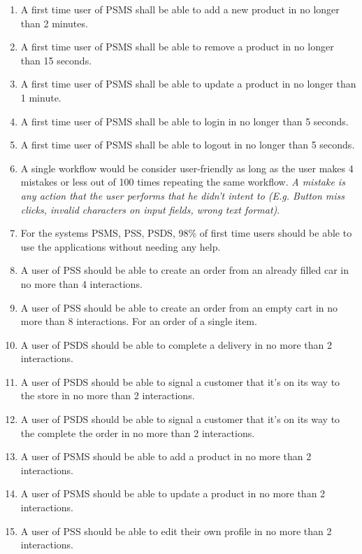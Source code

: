 \begin{enumerate}[label=USE-\arabic*]
    \item A first time user of PSMS shall be able to add a new product in 
    no longer than 2 minutes.
    \item A first time user of PSMS shall be able to remove a product in 
    no longer than 15 seconds.
    \item A first time user of PSMS shall be able to update a product in 
    no longer than 1 minute.
    \item A first time user of PSMS shall be able to login in no longer 
    than 5 seconds.
    \item A first time user of PSMS shall be able to logout in no longer 
    than 5 seconds.
    \item A single workflow would be consider user-friendly as long as the 
    user makes 4 mistakes or less out of 100 times repeating the same workflow. 
    \textit{A mistake is any action that the user performs that he didn’t 
    intent to (E.g. Button miss clicks, invalid characters on input fields, 
    wrong text format)}.
    \item For the systems PSMS, PSS, PSDS, 98\% of first time users should be 
    able to use the applications without needing any help.
    \item A user of PSS should be able to create an order from an already 
    filled car in no more than 4 interactions.
    \item A user of PSS should be able to create an order from an empty cart 
    in no more than 8 interactions. For an order of a single item.
    \item A user of PSDS should be able to complete a delivery in no more 
    than 2 interactions.
    \item A user of PSDS should be able to signal a customer that it’s on its 
    way to the store in no more than 2 interactions.
    \item A user of PSDS should be able to signal a customer that it’s on its
    way to the complete the order in no more than 2 interactions.
    \item A user of PSMS should be able to add a product in no more 
    than 2 interactions.
    \item A user of PSMS should be able to update a product in no more 
    than 2 interactions.
    \item A user of PSS should be able to edit their own profile in no more 
    than 2 interactions.
\end{enumerate}

